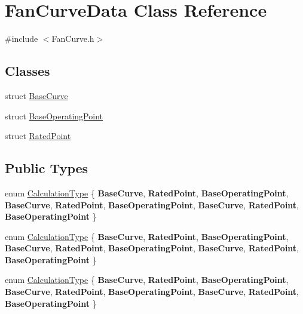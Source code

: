 \hypertarget{class_fan_curve_data}{}\section{Fan\+Curve\+Data Class Reference}
\label{class_fan_curve_data}


{\ttfamily \#include $<$Fan\+Curve.\+h$>$}

\subsection*{Classes}
\begin{DoxyCompactItemize}
\item 
struct \hyperlink{struct_fan_curve_data_1_1_base_curve}{Base\+Curve}
\item 
struct \hyperlink{struct_fan_curve_data_1_1_base_operating_point}{Base\+Operating\+Point}
\item 
struct \hyperlink{struct_fan_curve_data_1_1_rated_point}{Rated\+Point}
\end{DoxyCompactItemize}
\subsection*{Public Types}
\begin{DoxyCompactItemize}
\item 
enum \hyperlink{class_fan_curve_data_af87fafad0a2a00e26ba82fb33b1a7282}{Calculation\+Type} \{ \newline
{\bfseries Base\+Curve}, 
{\bfseries Rated\+Point}, 
{\bfseries Base\+Operating\+Point}, 
{\bfseries Base\+Curve}, 
\newline
{\bfseries Rated\+Point}, 
{\bfseries Base\+Operating\+Point}, 
{\bfseries Base\+Curve}, 
{\bfseries Rated\+Point}, 
\newline
{\bfseries Base\+Operating\+Point}
 \}
\item 
enum \hyperlink{class_fan_curve_data_af87fafad0a2a00e26ba82fb33b1a7282}{Calculation\+Type} \{ \newline
{\bfseries Base\+Curve}, 
{\bfseries Rated\+Point}, 
{\bfseries Base\+Operating\+Point}, 
{\bfseries Base\+Curve}, 
\newline
{\bfseries Rated\+Point}, 
{\bfseries Base\+Operating\+Point}, 
{\bfseries Base\+Curve}, 
{\bfseries Rated\+Point}, 
\newline
{\bfseries Base\+Operating\+Point}
 \}
\item 
enum \hyperlink{class_fan_curve_data_af87fafad0a2a00e26ba82fb33b1a7282}{Calculation\+Type} \{ \newline
{\bfseries Base\+Curve}, 
{\bfseries Rated\+Point}, 
{\bfseries Base\+Operating\+Point}, 
{\bfseries Base\+Curve}, 
\newline
{\bfseries Rated\+Point}, 
{\bfseries Base\+Operating\+Point}, 
{\bfseries Base\+Curve}, 
{\bfseries Rated\+Point}, 
\newline
{\bfseries Base\+Operating\+Point}
 \}
\end{DoxyCompactItemize}
